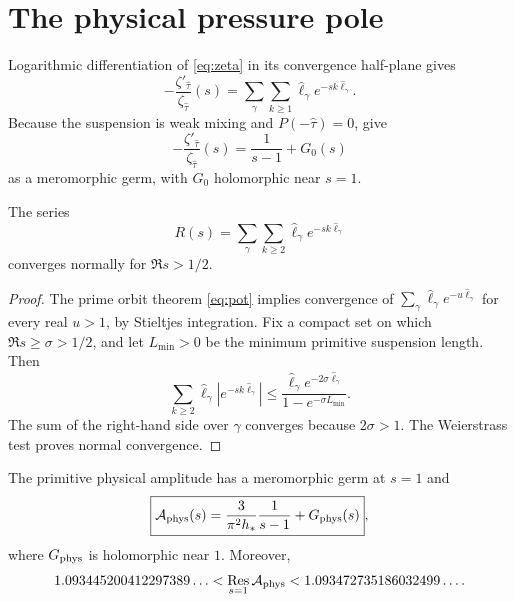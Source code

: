 \section{The physical pressure pole}

Logarithmic differentiation of \eqref{eq:zeta} in its convergence half-plane
gives
\begin{equation}
-\frac{\zeta'_{\widehat\tau}}{\zeta_{\widehat\tau}}(s)
=\sum_\gamma\sum_{k\ge1}
\widehat\ell_\gamma e^{-sk\widehat\ell_\gamma}.
\label{eq:logder}
\end{equation}
Because the suspension is weak mixing and
\(P(-\widehat\tau)=0\), \citet[Theorem~6.3 and
Corollary~6.3.1]{ParryPollicott1990} give
\begin{equation}
-\frac{\zeta'_{\widehat\tau}}{\zeta_{\widehat\tau}}(s)
=\frac1{s-1}+G_0(s)
\label{eq:zeta-principal}
\end{equation}
as a meromorphic germ, with \(G_0\) holomorphic near \(s=1\).

\begin{lemma}
The series
\begin{equation}
R(s)=\sum_\gamma\sum_{k\ge2}
\widehat\ell_\gamma e^{-sk\widehat\ell_\gamma}
\label{eq:tail}
\end{equation}
converges normally for \(\Re s>1/2\).
\end{lemma}

\begin{proof}
The prime orbit theorem \eqref{eq:pot} implies convergence of
\(\sum_\gamma\widehat\ell_\gamma e^{-u\widehat\ell_\gamma}\) for every
real \(u>1\), by Stieltjes integration.  Fix a compact set on which
\(\Re s\ge\sigma>1/2\), and let \(L_{\min}>0\) be the minimum primitive
suspension length.  Then
\[
 \sum_{k\ge2}\widehat\ell_\gamma
 |e^{-sk\widehat\ell_\gamma}|
 \le
 \frac{\widehat\ell_\gamma e^{-2\sigma\widehat\ell_\gamma}}
 {1-e^{-\sigma L_{\min}}}.
\]
The sum of the right-hand side over \(\gamma\) converges because
\(2\sigma>1\).  The Weierstrass test proves normal convergence.
\end{proof}

\begin{theorem}
The primitive physical amplitude has a meromorphic germ at \(s=1\) and
\begin{equation}
\boxed{
\mathcal A_{\rm phys}(s)
=\frac{3}{\pi^2h_*}\frac1{s-1}+G_{\rm phys}(s)},
\label{eq:physical-pole}
\end{equation}
where \(G_{\rm phys}\) is holomorphic near \(1\).  Moreover,
\begin{equation}
1.093445200412297389\ldots
<\operatorname*{Res}_{s=1}\mathcal A_{\rm phys}
<1.093472735186032499\ldots.
\label{eq:residue-interval}
\end{equation}
\end{theorem}

